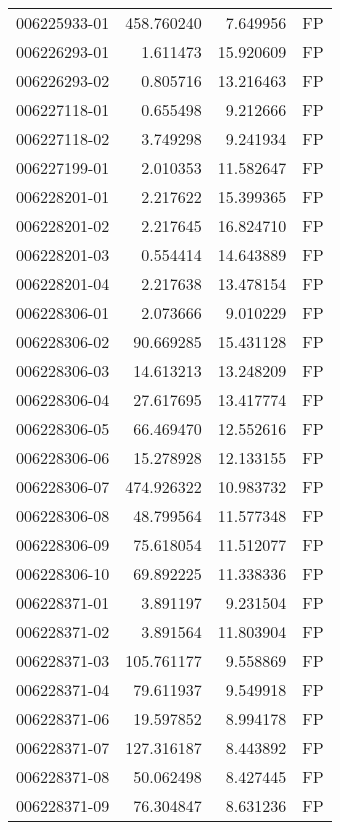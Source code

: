 \begin{tabular}{lrrl}
006225933-01 &  458.760240 &       7.649956 &   FP \\
006226293-01 &    1.611473 &      15.920609 &   FP \\
006226293-02 &    0.805716 &      13.216463 &   FP \\
006227118-01 &    0.655498 &       9.212666 &   FP \\
006227118-02 &    3.749298 &       9.241934 &   FP \\
006227199-01 &    2.010353 &      11.582647 &   FP \\
006228201-01 &    2.217622 &      15.399365 &   FP \\
006228201-02 &    2.217645 &      16.824710 &   FP \\
006228201-03 &    0.554414 &      14.643889 &   FP \\
006228201-04 &    2.217638 &      13.478154 &   FP \\
006228306-01 &    2.073666 &       9.010229 &   FP \\
006228306-02 &   90.669285 &      15.431128 &   FP \\
006228306-03 &   14.613213 &      13.248209 &   FP \\
006228306-04 &   27.617695 &      13.417774 &   FP \\
006228306-05 &   66.469470 &      12.552616 &   FP \\
006228306-06 &   15.278928 &      12.133155 &   FP \\
006228306-07 &  474.926322 &      10.983732 &   FP \\
006228306-08 &   48.799564 &      11.577348 &   FP \\
006228306-09 &   75.618054 &      11.512077 &   FP \\
006228306-10 &   69.892225 &      11.338336 &   FP \\
006228371-01 &    3.891197 &       9.231504 &   FP \\
006228371-02 &    3.891564 &      11.803904 &   FP \\
006228371-03 &  105.761177 &       9.558869 &   FP \\
006228371-04 &   79.611937 &       9.549918 &   FP \\
006228371-06 &   19.597852 &       8.994178 &   FP \\
006228371-07 &  127.316187 &       8.443892 &   FP \\
006228371-08 &   50.062498 &       8.427445 &   FP \\
006228371-09 &   76.304847 &       8.631236 &   FP \\

\end{tabular}
